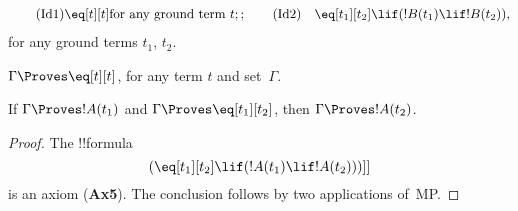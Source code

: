 \documentclass[../../include/open-logic-section]{subfiles}
\begin{document}


\begin{defn} 
\begin{align}
\tag{Id1} & \eq[t][t] \text{for any ground term~$t$};;
\tag{Id2} & \eq[t_1][t_2] \lif (!B(t_1) \lif
  !B(t_2)),
\end{align}
for any ground terms $t_1$, $t_2$.
\end{defn}

\begin{prop}
 $\Gamma \Proves \eq[t][t]$, for any term $t$ and set~$\Gamma$.
\end{prop}

\begin{prop}
  If $\Gamma \Proves !A(t_1)$ and $\Gamma \Proves
  \eq[t_1][t_2]$, then $\Gamma \Proves !A(t_2)$.
\end{prop}

\begin{proof}
The !!{formula}
\[
(\eq[t_1][t_2] \lif (!A(t_1) \lif !A(t_2)))]]
\]
is an axiom (\textbf{Ax5}). The conclusion follows by two applications
of~MP.
\end{proof}
\end{document}
